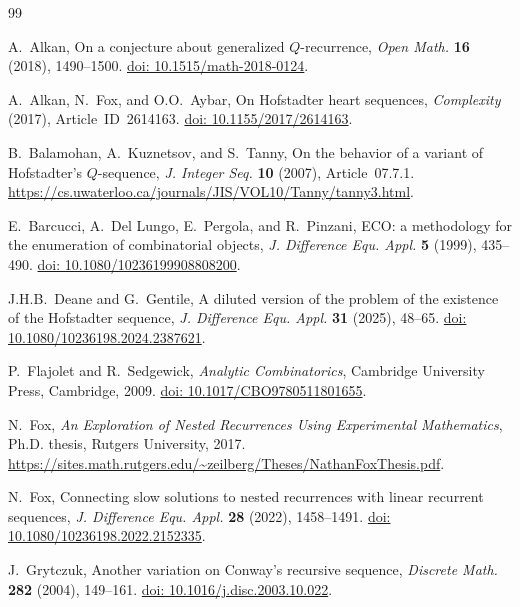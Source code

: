 \documentclass[11pt]{article}
\theoremstyle{definition}
\theoremstyle{remark}
\begin{document}
\begin{thebibliography}{99}

A.~Alkan,
On a conjecture about generalized $Q$-recurrence,
\textit{Open Math.} \textbf{16} (2018), 1490--1500.
\href{https://doi.org/10.1515/math-2018-0124}{doi: 10.1515/math-2018-0124}.

A.~Alkan, N.~Fox, and O.O.~Aybar,
On Hofstadter heart sequences,
\textit{Complexity} (2017), Article~ID~2614163.
\href{https://doi.org/10.1155/2017/2614163}{doi: 10.1155/2017/2614163}.

B.~Balamohan, A.~Kuznetsov, and S.~Tanny,
On the behavior of a variant of Hofstadter's $Q$-sequence,
\textit{J. Integer Seq.} \textbf{10} (2007), Article~07.7.1.
\url{https://cs.uwaterloo.ca/journals/JIS/VOL10/Tanny/tanny3.html}.

E.~Barcucci, A.~Del Lungo, E.~Pergola, and R.~Pinzani,
ECO: a methodology for the enumeration of combinatorial objects,
\textit{J. Difference Equ. Appl.} \textbf{5} (1999), 435--490.
\href{https://doi.org/10.1080/10236199908808200}{doi: 10.1080/10236199908808200}.

J.H.B.~Deane and G.~Gentile,
A diluted version of the problem of the existence of the Hofstadter sequence,
\textit{J. Difference Equ. Appl.} \textbf{31} (2025), 48--65.
\href{https://doi.org/10.1080/10236198.2024.2387621}{doi: 10.1080/10236198.2024.2387621}.

P.~Flajolet and R.~Sedgewick,
\textit{Analytic Combinatorics},
Cambridge University Press, Cambridge, 2009.
\href{https://doi.org/10.1017/CBO9780511801655}{doi: 10.1017/CBO9780511801655}.

N.~Fox,
\textit{An Exploration of Nested Recurrences Using Experimental Mathematics},
Ph.D. thesis, Rutgers University, 2017.
\url{https://sites.math.rutgers.edu/~zeilberg/Theses/NathanFoxThesis.pdf}.

N.~Fox,
Connecting slow solutions to nested recurrences with linear recurrent
sequences,
\textit{J. Difference Equ. Appl.} \textbf{28} (2022), 1458--1491.
\href{https://doi.org/10.1080/10236198.2022.2152335}{doi: 10.1080/10236198.2022.2152335}.

J.~Grytczuk,
Another variation on Conway's recursive sequence,
\textit{Discrete Math.} \textbf{282} (2004), 149--161.
\href{https://doi.org/10.1016/j.disc.2003.10.022}{doi: 10.1016/j.disc.2003.10.022}.


\end{thebibliography}
\end{document}
